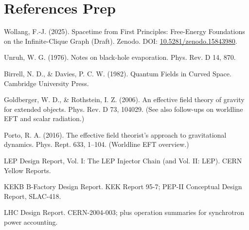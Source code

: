 \documentclass[11pt]{article}
\begin{document}
\section*{References Prep}
\noindent Wollang, F.-J. (2025). Spacetime from First Principles: Free-Energy Foundations on the Infinite-Clique Graph (Draft). Zenodo. DOI: \href{https://doi.org/10.5281/zenodo.15843980}{10.5281/zenodo.15843980}.

\medskip
\noindent Unruh, W. G. (1976). Notes on black-hole evaporation. Phys. Rev. D 14, 870.

\noindent Birrell, N. D., \& Davies, P. C. W. (1982). Quantum Fields in Curved Space. Cambridge University Press.

\noindent Goldberger, W. D., \& Rothstein, I. Z. (2006). An effective field theory of gravity for extended objects. Phys. Rev. D 73, 104029. (See also follow-ups on worldline EFT and scalar radiation.)

\noindent Porto, R. A. (2016). The effective field theorist’s approach to gravitational dynamics. Phys. Rept. 633, 1–104. (Worldline EFT overview.)

\noindent LEP Design Report, Vol. I: The LEP Injector Chain (and Vol. II: LEP). CERN Yellow Reports.

\noindent KEKB B-Factory Design Report. KEK Report 95-7; PEP-II Conceptual Design Report, SLAC-418.

\noindent LHC Design Report. CERN-2004-003; plus operation summaries for synchrotron power accounting.

\medskip

\appendix

\end{document}
